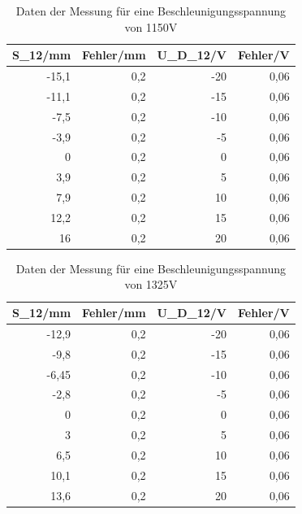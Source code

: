 \documentclass[12pt]{scrartcl}
\begin{document}
\begin{table}[htbp]
\caption{Daten der Messung für eine Beschleunigungsspannung von 1150V}
\begin{center}
\begin{tabular}{|r|r|r|r|}
\hline
\multicolumn{1}{|l|}{S\_12/mm} & \multicolumn{1}{l|}{Fehler/mm} & \multicolumn{1}{l|}{U\_D\_12/V} & \multicolumn{1}{l|}{Fehler/V} \\ \hline
-15,1 & 0,2 & -20 & 0,06 \\ \hline
-11,1 & 0,2 & -15 & 0,06 \\ \hline
-7,5 & 0,2 & -10 & 0,06 \\ \hline
-3,9 & 0,2 & -5 & 0,06 \\ \hline
0 & 0,2 & 0 & 0,06 \\ \hline
3,9 & 0,2 & 5 & 0,06 \\ \hline
7,9 & 0,2 & 10 & 0,06 \\ \hline
12,2 & 0,2 & 15 & 0,06 \\ \hline
16 & 0,2 & 20 & 0,06 \\ \hline
\end{tabular}
\end{center}
\label{tab:materialeigenschaften}
\end{table}




\begin{table}[htbp]
\caption{Daten der Messung für eine Beschleunigungsspannung von 1325V}
\begin{center}
\begin{tabular}{|r|r|r|r|}
\hline
\multicolumn{1}{|l|}{S\_12/mm} & \multicolumn{1}{l|}{Fehler/mm} & \multicolumn{1}{l|}{U\_D\_12/V} & \multicolumn{1}{l|}{Fehler/V} \\ \hline
-12,9 & 0,2 & -20 & 0,06 \\ \hline
-9,8 & 0,2 & -15 & 0,06 \\ \hline
-6,45 & 0,2 & -10 & 0,06 \\ \hline
-2,8 & 0,2 & -5 & 0,06 \\ \hline
0 & 0,2 & 0 & 0,06 \\ \hline
3 & 0,2 & 5 & 0,06 \\ \hline
6,5 & 0,2 & 10 & 0,06 \\ \hline
10,1 & 0,2 & 15 & 0,06 \\ \hline
13,6 & 0,2 & 20 & 0,06 \\ \hline
\end{tabular}
\end{center}
\label{tab:materialeigenschaften}
\end{table}
\end{document}
